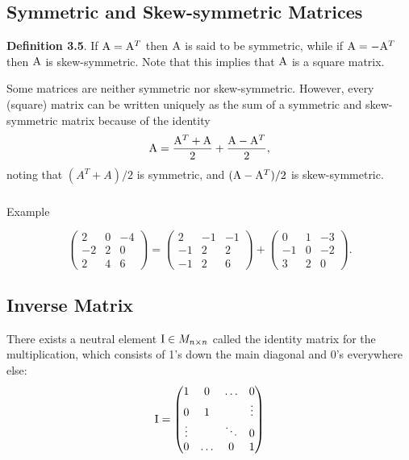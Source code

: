\documentclass[
  letterpaper,
  DIV=11,
  numbers=noendperiod]{scrartcl}
\makeatletter
\let\oldsubparagraph\subparagraph
\renewcommand{\subparagraph}{
    \@ifstar
      \xxxSubParagraphStar
      \xxxSubParagraphNoStar
  }
\newcommand{\xxxSubParagraphStar}[1]{\oldsubparagraph*{#1}\mbox{}}
\newcommand{\xxxSubParagraphNoStar}[1]{\oldsubparagraph{#1}\mbox{}}
\theoremstyle{remark}
\makeatother
\begin{document}
\subsection{Symmetric and Skew-symmetric
Matrices}\label{subsec:symmetric}

\textbf{Definition 3.5}. If \({\rm A}={\rm A}^T\) then \({\rm A}\) is
said to be symmetric, while if \({\rm A}= - {\rm A}^T\) then \({\rm A}\)
is skew-symmetric. Note that this implies that \({\rm A}\) is a square
matrix.

Some matrices are neither symmetric nor skew-symmetric. However, every
(square) matrix can be written uniquely as the sum of a symmetric and
skew-symmetric matrix because of the identity
\[{\rm A} = \frac{{\rm A}^{T}+{\rm A}}{2} + \frac{{\rm A}- {\rm A}^{T}}{2} ,\]
noting that \((A^{T}+A)/2\) is symmetric, and
\(({\rm A}- {\rm A}^{T} )/2\) is skew-symmetric.

\subparagraph{Example}\label{example-1}

\[\left( \begin{array}{rrr}
 2  & 0  & {-4}  \\
 {-2}  & 2  & 0  \\
 2  & 4  & 6  
\end{array}  \right) =\left(\begin{array}{rrr}
 2  & {-1}  & {-1}  \\
 {-1}  & 2  & 2  \\
 {-1}  & 2  & 6  
\end{array}  \right)+\left( \begin{array}{rrr}
 0  & 1  & {-3}  \\
 {-1}  & 0  & {-2}  \\
 3  & 2  & 0  
\end{array}  \right).\]

\subsection{Inverse Matrix}\label{inverse-matrix}

There exists a neutral element \({\rm I} \in M_{n\times n}\) called the
identity matrix for the multiplication, which consists of 1's down the
main diagonal and 0's everywhere else: \[{\rm I} =  \begin{pmatrix}
          1 &0  &\ldots   &0  \\
          0 &1  &   &\vdots   \\
           \vdots  &   & \ddots  &0 \\
          0   &  \ldots &  0&1
        \end{pmatrix}\]
\end{document}
